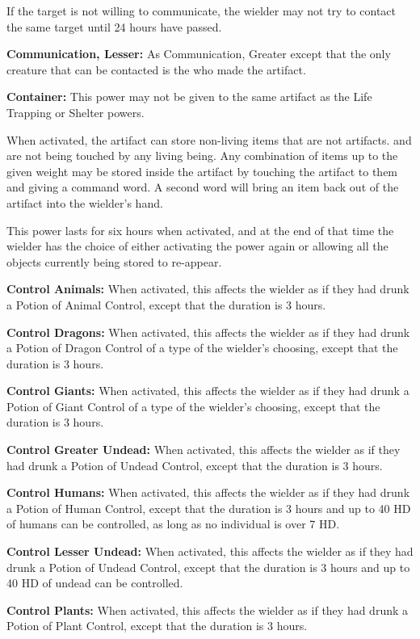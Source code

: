 \begin{multicols*}{2}
If the target is not willing to communicate, the wielder may not try to contact the same target until 24 hours have passed.

\textbf{Communication, Lesser:} As Communication, Greater except that the only creature that can be contacted is the  who made the artifact.

\textbf{Container:} This power may not be given to the same artifact as the Life Trapping or Shelter powers.

When activated, the artifact can store non-living items that are not artifacts. and are not being touched by any living being. Any combination of items up to the given weight may be stored inside the artifact by touching the artifact to them and giving a command word. A second word will bring an item back out of the artifact into the wielder’s hand.

This power lasts for six hours when activated, and at the end of that time the wielder has the choice of either activating the power again or allowing all the objects currently being stored to re-appear.

\textbf{Control Animals:} When activated, this affects the wielder as if they had drunk a Potion of Animal Control, except that the duration is 3 hours.

\textbf{Control Dragons:} When activated, this affects the wielder as if they had drunk a Potion of Dragon Control of a type of the wielder’s choosing, except that the duration is 3 hours.

\textbf{Control Giants:} When activated, this affects the wielder as if they had drunk a Potion of Giant Control of a type of the wielder’s choosing, except that the duration is 3 hours.

\textbf{Control Greater Undead:} When activated, this affects the wielder as if they had drunk a Potion of Undead Control, except that the duration is 3 hours.

\textbf{Control Humans:} When activated, this affects the wielder as if they had drunk a Potion of Human Control, except that the duration is 3 hours and up to 40 HD of humans can be controlled, as long as no individual is over 7 HD.

\textbf{Control Lesser Undead:} When activated, this affects the wielder as if they had drunk a Potion of Undead Control, except that the duration is 3 hours and up to 40 HD of undead can be controlled.

\textbf{Control Plants:} When activated, this affects the wielder as if they had drunk a Potion of Plant Control, except that the duration is 3 hours.


\end{multicols*}
